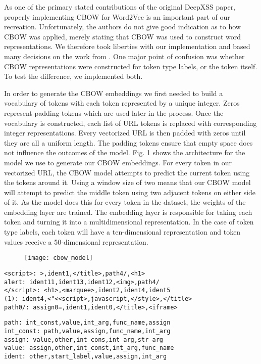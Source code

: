 As one of the primary stated contributions of the original DeepXSS \cite{fang2018deepxss} paper, properly implementing CBOW for Word2Vec is an important part of our recreation. Unfortunately, the authors do not give good indication as to how CBOW was applied, merely stating that CBOW was used to construct word representations. We therefore took liberties with our implementation and based many decisions on the work from \cite{afzal2021deeplearning}. One major point of confusion was whether CBOW representations were constructed for token type labels, or the token itself. To test the difference, we implemented both.

In order to generate the CBOW embeddings we first needed to build a vocabulary of tokens with each token represented by a unique integer. Zeros represent padding tokens which are used later in the process.  Once the vocabulary is constructed, each list of URL tokens is replaced with corresponding integer representations.  Every vectorized URL is then padded with zeros until they are all a uniform length.  The padding tokens ensure that empty space does not influence the outcomes of the model.
Fig. 1 shows the architecture for the model we use to generate our CBOW embeddings.  For every token in our vectorized URL, the CBOW model attempts to predict the current token using the tokens around it.  Using a window size of two means that our CBOW model will attempt to predict the middle token using two adjacent tokens on either side of it.  As the model does this for every token in the dataset, the weights of the embedding layer are trained.  The embedding layer is responsible for taking each token and turning it into a multidimensional representation.  In the case of token type labels, each token will have a ten-dimensional representation and token values receive a 50-dimensional representation.

\begin{figure}[H]
    \texttt{[image: cbow\_model]}
\end{figure}

\begin{lstlisting}[caption=Related token values, label=cbow-exp-value]
<script>: >,ident1,</title>,path4/,<h1>
alert: ident11,ident13,ident12,<img>,path4/
</script>: <h1>,<marquee>,ident2,ident4,ident5
(1): ident4,<"<<script>,javascript,</style>,</title>
path0/: assign0=,ident1,ident0,</title>,<iframe>  
\end{lstlisting}


\begin{lstlisting}[caption=Related token types, label=cbow-exp-type]
path: int_const,value,int_arg,func_name,assign
int_const: path,value,assign,func_name,int_arg
assign: value,other,int_cons,int_arg,str_arg
value: assign,other,int_const,int_arg,func_name
ident: other,start_label,value,assign,int_arg  
\end{lstlisting}

